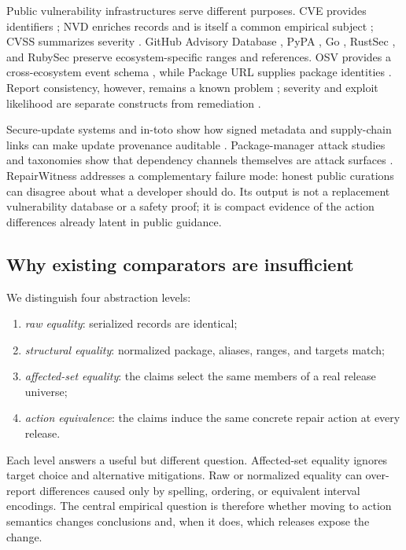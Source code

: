 \documentclass[10pt,conference]{IEEEtran}
\begin{document}
Public vulnerability infrastructures serve different purposes. CVE provides identifiers \cite{mell2002cve,cveprogram}; NVD enriches records and is itself a common empirical subject \cite{nvd,singla2023nvd}; CVSS summarizes severity \cite{cvss31}. GitHub Advisory Database \cite{ghad}, PyPA \cite{pypaadvisory}, Go \cite{govulndb}, RustSec \cite{rustsecdb}, and RubySec \cite{rubysecdb} preserve ecosystem-specific ranges and references. OSV provides a cross-ecosystem event schema \cite{osvschema}, while Package URL supplies package identities \cite{purlspec}. Report consistency, however, remains a known problem \cite{dong2019inconsistencies}; severity and exploit likelihood are separate constructs from remediation \cite{allodi2014severity,bozorgi2010beyond,sabottke2015social}.

Secure-update systems and in-toto show how signed metadata and supply-chain links can make update provenance auditable \cite{cappos2008mirror,torresarias2019intoto}. Package-manager attack studies and taxonomies show that dependency channels themselves are attack surfaces \cite{duan2021package,zahan2022weaklinks,ladisa2023taxonomy,ohm2020backstabber}. RepairWitness addresses a complementary failure mode: honest public curations can disagree about what a developer should do. Its output is not a replacement vulnerability database or a safety proof; it is compact evidence of the action differences already latent in public guidance.

\subsection{Why existing comparators are insufficient}
We distinguish four abstraction levels:
\begin{enumerate}
  \item \emph{raw equality}: serialized records are identical;
  \item \emph{structural equality}: normalized package, aliases, ranges, and targets match;
  \item \emph{affected-set equality}: the claims select the same members of a real release universe;
  \item \emph{action equivalence}: the claims induce the same concrete repair action at every release.
\end{enumerate}
Each level answers a useful but different question. Affected-set equality ignores target choice and alternative mitigations. Raw or normalized equality can over-report differences caused only by spelling, ordering, or equivalent interval encodings. The central empirical question is therefore whether moving to action semantics changes conclusions and, when it does, which releases expose the change.
\end{document}
